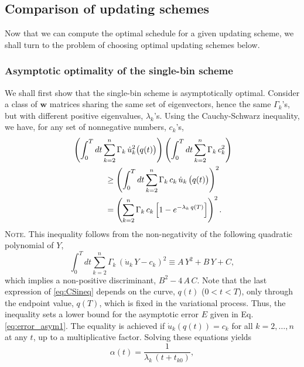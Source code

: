 \documentclass[reprint, floatfix]{revtex4-1}
\newcommand{\note}[1]{{\color{DarkGreen}\footnotesize \textsc{Note.} #1}}
\newcommand{\Err}{E}
\begin{document}
\subsection{\label{sec:cmpschemes}
Comparison of updating schemes}


Now that we can compute the optimal schedule
for a given updating scheme,
we shall turn to the problem of choosing
optimal updating schemes below.


\subsubsection{\label{sec:optWL}
Asymptotic optimality of the single-bin scheme}



We shall first show
that the single-bin scheme is asymptotically optimal.
%
Consider a class of $\mathbf w$ matrices
sharing the same set of eigenvectors,
hence the same $\Gamma_k$'s,
but with different positive eigenvalues,
$\lambda_k$'s.
%
Using the Cauchy-Schwarz inequality, we have,
for any set of nonnegative numbers, $c_k$'s,
%
\begin{align}
&
\left(
  \int_0^T dt
    \sum_{k = 2}^n
      \Gamma_k \, \dot u_k^2\bigl( q(t) \bigr)
\right)
%
\left(
  \int_0^T dt
    \sum_{k = 2}^n
      \Gamma_k \, c_k^2
\right)
%
\notag
\\
&
\qquad \qquad
\ge
\left(
  \int_0^T dt
    \sum_{k = 2}^n
      \Gamma_k \, c_k \, \dot u_k \, \bigl( q(t) \bigr)
\right)^2
\notag
\\
&
\qquad \qquad
=
\left(
  \sum_{k = 2}^n \Gamma_k \, c_k
    \left[
      1 - e^{ -\lambda_k \, q(T) }
    \right]
\right)^2.
\label{eq:CSineq}
\end{align}
%
\note{This inequality follows from the non-negativity of
the following quadratic polynomial of $Y$,
$$
\int_0^T
  dt \sum_{k = 2}^n \Gamma_k \,
    \left( \dot u_k \, Y - c_k \right)^2
  \equiv
  A \, Y^2 + B \, Y + C
  ,
$$
which implies a non-positive discriminant,
$B^2 - 4 \, A \, C$.
}%
%
Note that the last expression of \eqref{eq:CSineq}
depends on the curve, $q(t)$ ($0 < t < T$),
only through the endpoint value, $q(T)$,
which is fixed in the variational process.
%
Thus, the inequality sets a lower bound
for the asymptotic error $\Err$
given in Eq. \eqref{eq:error_asym1}.
%
The equality is achieved
if $\dot u_k\left( q(t) \right) = c_k$
for all $k = 2, \dots, n$ at any $t$,
up to a multiplicative factor.
%
Solving these equations yields
%
\begin{equation}
  \alpha(t) = \frac{              1             }
                   { \lambda_k \, (t + t_{k0} ) },
\label{eq:alpha_invtk}
\end{equation}
\end{document}
